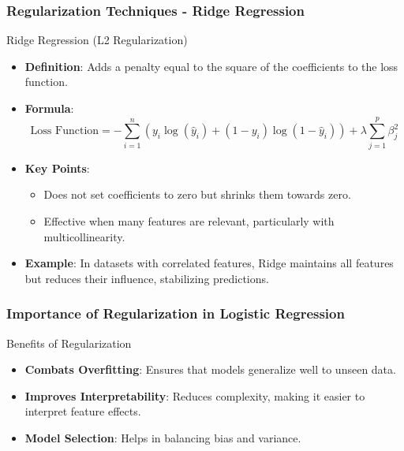 \documentclass[aspectratio=169]{beamer}
\begin{document}
\begin{frame}[fragile]
    \frametitle{Regularization Techniques - Ridge Regression}
    \begin{block}{Ridge Regression (L2 Regularization)}
        \begin{itemize}
            \item \textbf{Definition}: Adds a penalty equal to the square of the coefficients to the loss function.
            \item \textbf{Formula}:
            \begin{equation}
                \text{Loss Function} = -\sum_{i=1}^{n} \left( y_i \log(\hat{y}_i) + (1 - y_i) \log(1 - \hat{y}_i) \right) + \lambda \sum_{j=1}^{p} \beta_j^2
            \end{equation}
            \item \textbf{Key Points}:
                \begin{itemize}
                    \item Does not set coefficients to zero but shrinks them towards zero.
                    \item Effective when many features are relevant, particularly with multicollinearity.
                \end{itemize}
            \item \textbf{Example}: In datasets with correlated features, Ridge maintains all features but reduces their influence, stabilizing predictions.
        \end{itemize}
    \end{block}
\end{frame}

\begin{frame}[fragile]
    \frametitle{Importance of Regularization in Logistic Regression}
    \begin{block}{Benefits of Regularization}
        \begin{itemize}
            \item \textbf{Combats Overfitting}: Ensures that models generalize well to unseen data.
            \item \textbf{Improves Interpretability}: Reduces complexity, making it easier to interpret feature effects.
            \item \textbf{Model Selection}: Helps in balancing bias and variance.
        \end{itemize}
    \end{block}
\end{frame}
\end{document}

